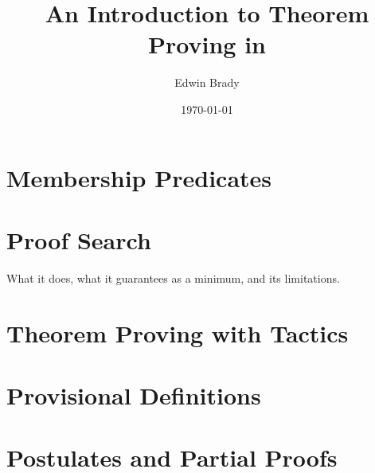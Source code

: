 \documentclass[british, final
              ]{article}
\title{An Introduction to Theorem Proving in \Idris{}}
\author{Edwin Brady}
\date{\origdate\today}
\begin{document}
\maketitle
\tableofcontents
\newpage






\section{Membership Predicates}

\section{Proof Search}

What it does, what it guarantees as a minimum, and its limitations.

\section{Theorem Proving with Tactics}

\section{Provisional Definitions}

\section{Postulates and Partial Proofs}




\appendix
\end{document}
